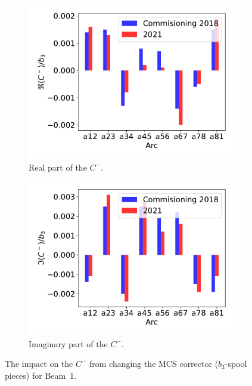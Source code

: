 \documentclass[a4paper]{cernatsnote}
\begin{document}
\begin{figure}[ht]
\begin{subfigure}{.5\textwidth}
  \centering
  \includegraphics[width=.8\linewidth]{plots/MCS/b_1change_re_per_b3.pdf}  
  \caption{Real part of the $C^-$.}
\end{subfigure}
\begin{subfigure}{.5\textwidth}
  \centering
  \includegraphics[width=.8\linewidth]{plots/MCS/b_1change_im_per_b3.pdf}  
  \caption{Imaginary part of the $C^-$.}
\end{subfigure}
\caption{The impact on the $C^-$ from changing the MCS corrector ($b_3$-spool pieces) for Beam~1. }
\label{fig:beam1_mcs}
\end{figure}
\end{document}
